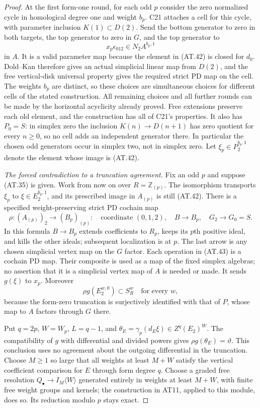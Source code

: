 \begin{proof}
At the first form-one round, for each odd $p$
consider the zero normalized cycle in homological
degree one and weight $b_p$.  C21 attaches a cell
for this cycle, with parameter inclusion
$K(1)\subset D(2)$.
Send the bottom generator to zero in both targets,
the top generator to zero in $G$, and the top
generator to
\[
       x_p\epsilon_{012}\in N_2A^{b_p,1}
 \tag{AT.42}
\]
in $A$.  It is a valid parameter map because the
element in \textup{(AT.42)} is closed for $d_0$.
Dold--Kan therefore gives an actual simplicial
linear map from $D(2)$, and the free vertical-disk
universal property gives the required strict PD
map on the cell.  The weights $b_p$ are distinct,
so these choices are simultaneous choices for
different cells of the stated construction.
All remaining choices and all further rounds
can be made by the horizontal acyclicity already
proved.  Free extensions preserve each old
element, and the construction has all of C21's
properties.  It also has $P_0=S$: in simplex zero
the inclusion $K(n)\to D(n+1)$ has zero quotient
for every $n\geq0$, so no cell adds an independent
generator there.  In particular the chosen odd
generators occur in simplex two, not in simplex zero.
Let $\xi_p\in P_2^{b_p,1}$ denote the element
whose image is \textup{(AT.42)}.

\emph{The forced contradiction to a truncation agreement.}
Fix an odd $p$ and suppose \textup{(AT.35)} is given.
Work from now on over $R=\mathbb Z_{(p)}$.
The isomorphism transports $\xi_p$ to
$\xi\in E_2^{b_p,1}$, and its prescribed image in
$A_{(p)}$ is still \textup{(AT.42)}.
There is a specified weight-preserving strict PD
cochain map
\[
 \rho:(A_{(p)})_2\longrightarrow (B_p)_{(p)}:
 \quad \text{coordinate }(0,1,2),\quad
 B\to B_p,\quad G_2\to G_0=S.
 \tag{AT.43}
\]
In this formula $B\to B_p$ extends coefficients to
$R_p$, keeps its $p$th positive ideal, and kills
the other ideals; subsequent localization is at $p$.
The last arrow is any chosen simplicial vertex
map on the $G$ factor.  Each operation in
\textup{(AT.43)} is a cochain PD map.  Their
composite is used as a map of the fixed simplex
algebras; no assertion that it is a simplicial
vertex map of $A$ is needed or made.
It sends $g(\xi)$ to $x_p$.  Moreover
\[
 \rho g(E_2^{w,0})\subset S_R^w
                    \quad\text{for every }w,
 \tag{AT.44}
\]
because the form-zero truncation is surjectively
identified with that of $P$, whose map to $A$
factors through $G$ there.

Put $q=2p$, $W=W_p$, $L=q-1$, and
$\theta_E=\gamma_p(d_E\xi)\in Z^q(E_2)^{W}$.
The compatibility of $g$ with differential and
divided powers gives $\rho g(\theta_E)=\vartheta$.
This conclusion uses no agreement about the outgoing
differential in the truncation.
Choose $M\geq1$ so large that all weights at least
$M+W$ satisfy the vertical coefficient comparison
for $E$ through form degree $q$.  Choose a graded
free resolution $Q_\bullet\to I_M\langle W\rangle$
generated entirely in weights at least $M+W$,
with finite free weight groups and kernels; the
construction in AT11, applied to this module,
does so.  Its reduction modulo $p$ stays exact.


\end{proof}
